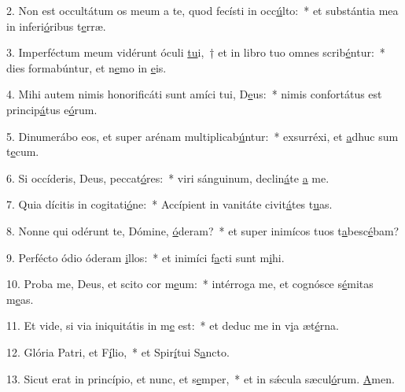 2. Non est occultátum os meum a te, quod fecísti in occ\uline{ú}lto:~* et substántia mea in inferi\uline{ó}ribus t\uline{e}rræ.\par 
3. Imperféctum meum vidérunt óculi \uline{tu}i,~† et in libro tuo omnes scrib\uline{é}ntur:~* dies formabúntur, et n\uline{e}mo in \uline{e}is.\par 
4. Mihi autem nimis honorificáti sunt amíci tui, D\uline{e}us:~* nimis confortátus est princip\uline{á}tus e\uline{ó}rum.\par 
5. Dinumerábo eos, et super arénam multiplicab\uline{ú}ntur:~* exsurréxi, et \uline{a}dhuc sum t\uline{e}cum.\par 
6. Si occíderis, Deus, peccat\uline{ó}res:~* viri sánguinum, declin\uline{á}te \uline{a} me.\par 
7. Quia dícitis in cogitati\uline{ó}ne:~* Accípient in vanitáte civit\uline{á}tes t\uline{u}as.\par 
8. Nonne qui odérunt te, Dómine, \uline{ó}deram?~* et super inimícos tuos t\uline{a}besc\uline{é}bam?\par 
9. Perfécto ódio óderam \uline{i}llos:~* et inimíci f\uline{a}cti sunt m\uline{i}hi.\par 
10. Proba me, Deus, et scito cor m\uline{e}um:~* intérroga me, et cognósce s\uline{é}mitas m\uline{e}as.\par 
11. Et vide, si via iniquitátis in m\uline{e} est:~* et deduc me in v\uline{i}a æt\uline{é}rna.\par 
12. Glória Patri, et F\uline{í}lio,~* et Spir\uline{í}tui S\uline{a}ncto.\par 
13. Sicut erat in princípio, et nunc, et s\uline{e}mper,~* et in sǽcula sæcul\uline{ó}rum. \uline{A}men.\par 

